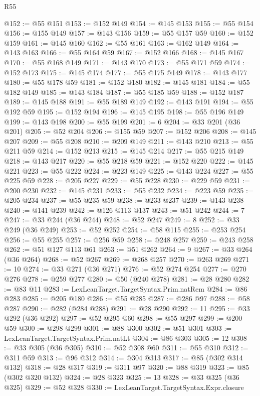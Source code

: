 \begin{lexlean}{R55}
\begin{coremodule}
@152 := @55 @151
@153 := @152 @149
@154 := @145 @153
@155 := @55 @154
@156 := @155 @149
@157 := @143 @156
@159 := @55 @157 @59
@160 := @152 @159
@161 := @145 @160
@162 := @55 @161
@163 := @162 @149
@164 := @143 @163
@166 := @55 @164 @59
@167 := @152 @166
@168 := @145 @167
@170 := @55 @168 @149
@171 := @143 @170
@173 := @55 @171 @59
@174 := @152 @173
@175 := @145 @174
@177 := @55 @175 @149
@178 := @143 @177
@180 := @55 @178 @59
@181 := @152 @180
@182 := @145 @181
@184 := @55 @182 @149
@185 := @143 @184
@187 := @55 @185 @59
@188 := @152 @187
@189 := @145 @188
@191 := @55 @189 @149
@192 := @143 @191
@194 := @55 @192 @59
@195 := @152 @194
@196 := @145 @195
@198 := @55 @196 @149
@199 := @143 @198
@200 := @55 @199
@201 := 6
@204 := @33 @201 (@36 @201)
@205 := @52 @204
@206 := @155 @59
@207 := @152 @206
@208 := @145 @207
@209 := @55 @208
@210 := @209 @149
@211 := @143 @210
@213 := @55 @211 @59
@214 := @152 @213
@215 := @145 @214
@217 := @55 @215 @149
@218 := @143 @217
@220 := @55 @218 @59
@221 := @152 @220
@222 := @145 @221
@223 := @55 @222
@224 := @223 @149
@225 := @143 @224
@227 := @55 @225 @59
@228 := @205 @227
@229 := @55 @228
@230 := @229 @59
@231 := @200 @230
@232 := @145 @231
@233 := @55 @232
@234 := @223 @59
@235 := @205 @234
@237 := @55 @235 @59
@238 := @233 @237
@239 := @143 @238
@240 := @141 @239
@242 := @126 @113 @137
@243 := @51 @242
@244 := 7
@247 := @33 @244 (@36 @244)
@248 := @52 @247
@249 := 8
@252 := @33 @249 (@36 @249)
@253 := @52 @252
@254 := @58 @115
@255 := @253 @254
@256 := @55 @255
@257 := @256 @59
@258 := @248 @257
@259 := @243 @258
@262 := @51 @127 @113 @61
@263 := @51 @262
@264 := 9
@267 := @33 @264 (@36 @264)
@268 := @52 @267
@269 := @268 @257
@270 := @263 @269
@271 := 10
@274 := @33 @271 (@36 @271)
@276 := @52 @274 @254
@277 := @270 @276
@278 := @259 @277
@280 := @50 (@240 @278)
@281 := @28 @280
@282 := @83 @11
@283 := LexLeanTarget.TargetSyntax.Prim.natRem
@284 := @86 @283
@285 := @205 @180
@286 := @55 @285
@287 := @286 @97
@288 := @58 @287
@290 := @282 (@284 @288)
@291 := @28 @290
@292 := 11
@295 := @33 @292 (@36 @292)
@297 := @52 @295 @60
@298 := @55 @297
@299 := @200 @59
@300 := @298 @299
@301 := @88 @300
@302 := @51 @301
@303 := LexLeanTarget.TargetSyntax.Prim.natLt
@304 := @86 @303
@305 := 12
@308 := @33 @305 (@36 @305)
@310 := @52 @308 @60
@311 := @55 @310
@312 := @311 @59
@313 := @96 @312
@314 := @304 @313
@317 := @85 (@302 @314 @132)
@318 := @28 @317
@319 := @311 @97
@320 := @88 @319
@323 := @85 (@302 @320 @132)
@324 := @28 @323
@325 := 13
@328 := @33 @325 (@36 @325)
@329 := @52 @328
@330 := LexLeanTarget.TargetSyntax.Expr.closure

\end{coremodule}
\end{lexlean}

